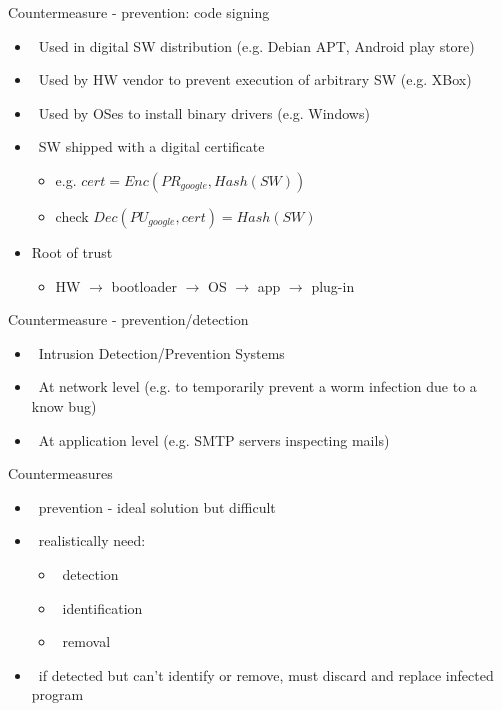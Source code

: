 \documentclass{beamer}
\begin{document}
\begin{frame}{Countermeasure - prevention: code signing}
  \begin{itemize}
  \item  Used in digital SW distribution (e.g. Debian APT, Android
    play store)
  \item  Used by HW vendor to prevent execution of arbitrary SW (e.g. XBox)
  \item  Used by OSes to install binary drivers (e.g. Windows)
  \item  SW shipped with a digital certificate
    \begin{itemize}
    \item e.g. $cert=Enc(PR_{google}, Hash(SW))$
    \item check $Dec(PU_{google}, cert) = Hash(SW)$
    \end{itemize}
  \item Root of trust
    \begin{itemize}
      \item HW $\rightarrow$ bootloader $\rightarrow$ OS $\rightarrow$
        app $\rightarrow$ plug-in
    \end{itemize}
  \end{itemize}
\end{frame}

\begin{frame}{Countermeasure - prevention/detection}
  \begin{itemize}
  \item  Intrusion Detection/Prevention Systems
  \item  At network level (e.g. to temporarily prevent a worm
    infection due to a know bug)
  \item  At application level (e.g. SMTP servers inspecting mails)
  \end{itemize}
\end{frame}


\begin{frame}{Countermeasures}
  \begin{itemize}
  \item  prevention - ideal solution but difficult 
  \item  realistically need: 
    \begin{itemize}
    \item  detection 
    \item  identification 
    \item  removal 
    \end{itemize}
  \item  if detected but can't identify or remove, must 
    discard and replace infected program
  \end{itemize}
\end{frame}
\end{document}
